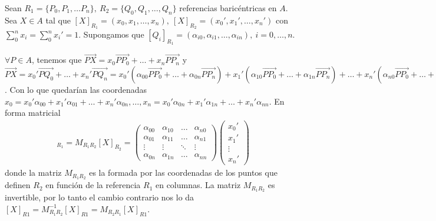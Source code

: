 \documentclass[14pt]{book}
\begin{document}
\begin{tm}
	Sean $R_1 = \{P_0, P_1, \dots P_n\},\ R_2 = \{Q_0, Q_1, \dots, Q_n\}$ referencias baricéntricas en $A$. Sea $X \in A$ tal que $[X]_{R_1} = (x_0, x_1, \dots, x_n),\ [X]_{R_2} = (x_0', x_1', \dots, x_n')$ con $\sum_{0}^{n} x_i = \sum_0^n x_i' = 1$. Supongamos que $[Q_i]_{R_1} = (\alpha_{i0}, \alpha_{i1}, \dots, \alpha_{in}),\ i = 0, \dots, n$.
	
	$\forall P \in A$, tenemos que $\overrightarrow{P X} = x_0 \overrightarrow{P P_0} + \dots + x_n \overrightarrow{P P_n}$ y $\overrightarrow{PX} = x_0' \overrightarrow{P Q_0} + \dots + x_n' \overrightarrow{P Q_n} = x_0' (\alpha_{00} \overrightarrow{P P_0} + \dots + \alpha_{0n} \overrightarrow{P P_n}) + x_1' (\alpha_{10} \overrightarrow{P P_0} + \dots + \alpha_{1n} \overrightarrow{P P_n}) + \dots + x_n' (\alpha_{n0} \overrightarrow{P P_0} +  \dots + \alpha_{nn} \overrightarrow{P P_n}) = (x_0' \alpha_{00} + x_1' \alpha_{10} + \dots + x_n' \alpha_{n0})\overrightarrow{P P_0} + \dots + (x_0' \alpha_{0n} + x_1' \alpha_{1n} + \dots + x_n' \alpha_{nn})\overrightarrow{P P_n}$. Con lo que quedarían las coordenadas $x_0 = x_0' \alpha_{00} + x_1' \alpha_{01} + \dots + x_n' \alpha_{0n}, \dots, x_n = x_0' \alpha_{0n} + x_1' \alpha_{1n} + \dots + x_n' \alpha_{nn}$. En forma matricial
	\begin{align*}
		[X]_{R_1} = M_{R_1 R_2}[X]_{R_2} = \left(
			\begin{array}{cccc}
				\alpha_{00} & \alpha_{10} & \dots & \alpha_{n0} \\
				\alpha_{01} & \alpha_{11} & \dots & \alpha_{n1} \\
				\vdots & \vdots & \ddots & \vdots \\
				\alpha_{0n} & \alpha_{1n} & \dots & \alpha_{nn} 
			\end{array}
		\right)\left(
			\begin{array}{c}
				x_0' \\ x_1' \\ \vdots \\ x_n'
			\end{array}
		\right)
	\end{align*} 
	donde la matriz $M_{R_1 R_2}$ es la formada por las coordenadas de los puntos que definen $R_2$ en función de la referencia $R_1$ en columnas. La matriz $M_{R_1 R_2}$ es invertible, por lo tanto el cambio contrario nos lo da $[X]_{R1} = M_{R_1 R_2}^{-1} [X]_{R1}= M_{R_2 R_1} [X]_{R1}$.
\end{tm}
\end{document}
